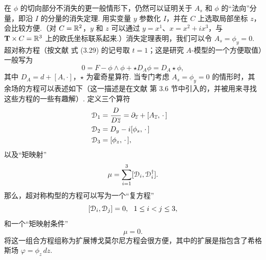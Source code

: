 在 $\phi$ 的切向部分不消失的更一般情形下，仍然可以证明关于 $A_s$ 和 $\phi$ 的“法向”分量，即沿 $I$ 的分量的消失定理. 用实变量 $y$ 参数化 $I$，并在 $C$ 上选取局部坐标 $z$，会比较方便.（对 $C={\mathbb R}^2$，$y$ 和 $z$ 可以通过 $y=x^1$、$x=x^2+ix^3$，与 ${\bf T}\times C={\mathbb R}^3$ 上的欧氏坐标联系起来.）消失定理表明，我们可以令 $A_s=\phi_y=0$. 超对称方程（按文献 \cite{KW} 式 (3.29) 的记号取 $t=1$；这是研究 $A$-模型的一个方便取值）一般写为
\begin{equation}\label{irko}0=F-\phi\wedge\phi+\star D_A\phi = D_A\star \phi, \end{equation}
其中 $D_A=d+[A,\cdot]$，$\star $ 为霍奇星算符. 当专门考虑 $A_s=\phi_y=0$ 的情形时，其余场的方程可以表述如下（这一描述是在文献 \cite{WittenKhov} 第 3.6 节中引入的，并被用来寻找这些方程的一些有趣解）. 定义三个算符
\begin{align}\label{doff}{\mathcal D}_1 & = \frac{D}{D\overline z}=\partial_{\overline z}  +[A_{\overline z},\,\cdot\, ]\cr
               {\mathcal D}_2& =D_y-i[\phi_s,\,\cdot\,]      \cr 
                  {\mathcal D}_3&=[\phi_z,\,\cdot\,] ,  \end{align}  
以及“矩映射”
\begin{equation}\label{zolff}\mu=\sum_{i=1}^3[{\mathcal D}_i,{\mathcal D}_i^\dagger].\end{equation} 
那么，超对称构型的方程可以写为一个“复方程”
\begin{equation}\label{woff} [{\mathcal D}_i,{\mathcal D}_j]=0,~~1\leq i<j\leq 3,\end{equation}
和一个“矩映射条件”
\begin{equation}\label{old} \mu=0.\end{equation}  
将这一组合方程组称为扩展博戈莫尔尼方程会很方便，其中的扩展是指包含了希格斯场 $\varphi=\phi_z\, dz$.

